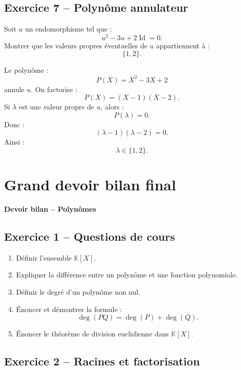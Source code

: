 \documentclass[11pt,a4paper]{article}
\newcommand{\K}{\mathbb K}
\newcommand{\Id}{\operatorname{Id}}
\begin{document}
\subsection*{Exercice 7 -- Polynôme annulateur}

\begin{exercicebox}
Soit \(u\) un endomorphisme tel que :
\[
u^2-3u+2\Id=0.
\]
Montrer que les valeurs propres éventuelles de \(u\) appartiennent à :
\[
\{1,2\}.
\]
\end{exercicebox}

\begin{correctionbox}
Le polynôme :
\[
P(X)=X^2-3X+2
\]
annule \(u\).  
On factorise :
\[
P(X)=(X-1)(X-2).
\]
Si \(\lambda\) est une valeur propre de \(u\), alors :
\[
P(\lambda)=0.
\]
Donc :
\[
(\lambda-1)(\lambda-2)=0.
\]
Ainsi :
\[
\lambda\in\{1,2\}.
\]
\end{correctionbox}

\newpage
\section{Grand devoir bilan final}

\begin{center}
\Large\textbf{Devoir bilan -- Polynômes}
\end{center}

\subsection*{Exercice 1 -- Questions de cours}

\begin{enumerate}
    \item Définir l'ensemble \(\K[X]\).
    \item Expliquer la différence entre un polynôme et une fonction polynomiale.
    \item Définir le degré d'un polynôme non nul.
    \item Énoncer et démontrer la formule :
    \[
    \deg(PQ)=\deg(P)+\deg(Q).
    \]
    \item Énoncer le théorème de division euclidienne dans \(\K[X]\).
\end{enumerate}

\subsection*{Exercice 2 -- Racines et factorisation}
\end{document}
